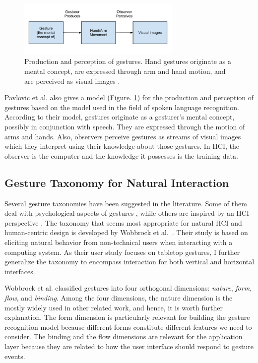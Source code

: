 \begin{figure}[tbh]
  \centering
  \includegraphics[width=0.7\textwidth]{figures/gesture_production.png} 
  \caption{Production and perception of gestures. Hand gestures originate as a
  mental concept, are expressed through arm and hand motion, and are perceived
  as visual images \cite{Pavlovic97}.}
  \label{fig:gesture_production}
\end{figure}

Pavlovic et al. \cite{Pavlovic97} also gives a model (Figure. 
\ref{fig:gesture_production}) for the production and perception of gestures 
based on the model used in the field of spoken language recognition. According 
to their model, gestures originate as a gesturer's mental concept, possibly in 
conjunction with speech. They are expressed through the motion of arms and 
hands. Also, observers perceive gestures as streams of visual images which they
interpret using their knowledge about those gestures. In HCI, the 
observer is the computer and the knowledge it possesses is the training data.

\subsection{Gesture Taxonomy for Natural Interaction}\label{sec:taxonomy}
Several gesture taxonomies have been suggested in the literature. Some of them
deal with psychological aspects of gestures \cite{kendon86, mcneill82}, while
others are inspired by an HCI perspective \cite{Pavlovic97, quek95, wobbrock09}. 
The taxonomy that seems most appropriate for natural HCI and human-centric
design is developed by Wobbrock et al.~\cite{wobbrock09}. Their study is based on
eliciting natural behavior from non-technical users when interacting with a computing system.
As their user study focuses on tabletop gestures, I further generalize the
taxonomy to encompass interaction for both vertical and horizontal interfaces.

Wobbrock et al. \cite{wobbrock09} classified gestures into four
orthogonal dimensions: \textit{nature}, \textit{form},
\textit{flow}, and \textit{binding}. Among the four dimensions, the nature
dimension is the mostly widely used in other related work, and hence, it is
worth further explanation.
The form dimension is particularly relevant for building the gesture recognition model because
different forms constitute different features we need to consider. The binding and the flow
dimensions are relevant for the application layer because they are related to
how the user interface should respond to gesture events.

